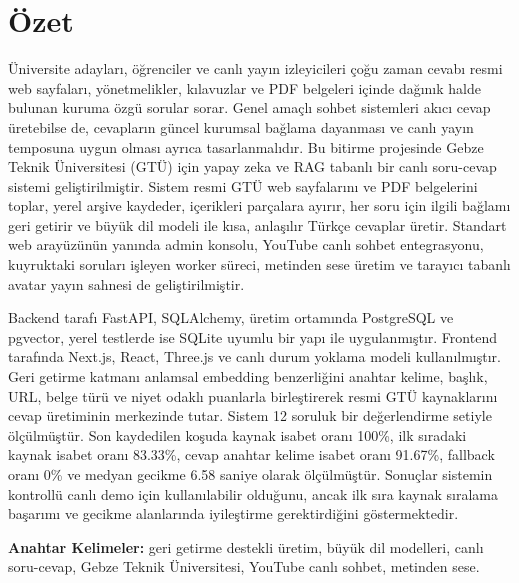\chapter*{Özet}

Üniversite adayları, öğrenciler ve canlı yayın izleyicileri çoğu zaman cevabı resmi web sayfaları, yönetmelikler, kılavuzlar ve PDF belgeleri içinde dağınık halde bulunan kuruma özgü sorular sorar. Genel amaçlı sohbet sistemleri akıcı cevap üretebilse de, cevapların güncel kurumsal bağlama dayanması ve canlı yayın temposuna uygun olması ayrıca tasarlanmalıdır. Bu bitirme projesinde Gebze Teknik Üniversitesi (GTÜ) için yapay zeka ve RAG tabanlı bir canlı soru-cevap sistemi geliştirilmiştir. Sistem resmi GTÜ web sayfalarını ve PDF belgelerini toplar, yerel arşive kaydeder, içerikleri parçalara ayırır, her soru için ilgili bağlamı geri getirir ve büyük dil modeli ile kısa, anlaşılır Türkçe cevaplar üretir. Standart web arayüzünün yanında admin konsolu, YouTube canlı sohbet entegrasyonu, kuyruktaki soruları işleyen worker süreci, metinden sese üretim ve tarayıcı tabanlı avatar yayın sahnesi de geliştirilmiştir.

Backend tarafı FastAPI, SQLAlchemy, üretim ortamında PostgreSQL ve pgvector, yerel testlerde ise SQLite uyumlu bir yapı ile uygulanmıştır. Frontend tarafında Next.js, React, Three.js ve canlı durum yoklama modeli kullanılmıştır. Geri getirme katmanı anlamsal embedding benzerliğini anahtar kelime, başlık, URL, belge türü ve niyet odaklı puanlarla birleştirerek resmi GTÜ kaynaklarını cevap üretiminin merkezinde tutar. Sistem 12 soruluk bir değerlendirme setiyle ölçülmüştür. Son kaydedilen koşuda kaynak isabet oranı 100\%, ilk sıradaki kaynak isabet oranı 83.33\%, cevap anahtar kelime isabet oranı 91.67\%, fallback oranı 0\% ve medyan gecikme 6.58 saniye olarak ölçülmüştür. Sonuçlar sistemin kontrollü canlı demo için kullanılabilir olduğunu, ancak ilk sıra kaynak sıralama başarımı ve gecikme alanlarında iyileştirme gerektirdiğini göstermektedir.

\vfill
\textbf{Anahtar Kelimeler:} geri getirme destekli üretim, büyük dil modelleri, canlı soru-cevap, Gebze Teknik Üniversitesi, YouTube canlı sohbet, metinden sese.
\clearpage
